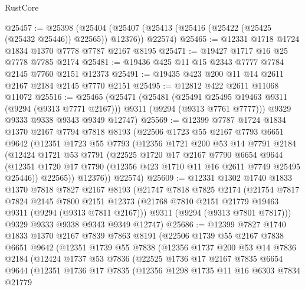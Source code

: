 \begin{lexlean}{RustCore}
\begin{coremodule}
@25457 := @25398
    (@25404 (@25407 (@25413 (@25416 (@25422 (@25425 (@25432 @25446)) @22565)) @12376)) @22574)
@25465 := @12331 @1718 @1724 @1834 @1370 @7778 @7787 @2167 @8195
@25471 := @19427 @1717 @16 @25 @7778 @7785 @2174
@25481 := @19436 @425 @11 @15 @2343 @7777 @7784 @2145 @7760 @2151 @12373
@25491 := @19435 @423 @200 @11 @14 @2611 @2167 @2184 @2145 @7770 @2151
@25495 := @12812 @422 @2611 @11068 @11072
@25516 := @25465
    (@25471
      (@25481
        (@25491 @25495 @19463 @9311 (@9294 (@9313 @7771 @2167)))
        @9311
        (@9294 (@9313 @7761 @7777)))
      @9329
      @9333
      @9338
      @9343
      @9349
      @12747)
@25569 := @12399
    @7787
    @1724
    @1834
    @1370
    @2167
    @7794
    @7818
    @8193
    (@22506
      @1723
      @55
      @2167
      @7793
      @6651
      @9642
      (@12351
        @1723
        @55
        @7793
        (@12356
          @1721
          @200
          @53
          @14
          @7791
          @2184
          (@12424
            @1721
            @53
            @7791
            (@22525
              @1720
              @17
              @2167
              @7790
              @6654
              @9644
              (@12351 @1720 @17 @7790 (@12356 @423 @1710 @11 @16 @2611 @7749 @25495 @25446))
              @22565))
          @12376))
      @22574)
@25609 := @12331
    @1302
    @1740
    @1833
    @1370
    @7818
    @7827
    @2167
    @8193
    (@21747
      @7818
      @7825
      @2174
      (@21754
        @7817
        @7824
        @2145
        @7800
        @2151
        @12373
        (@21768 @7810 @2151 @21779 @19463 @9311 (@9294 (@9313 @7811 @2167)))
        @9311
        (@9294 (@9313 @7801 @7817)))
      @9329
      @9333
      @9338
      @9343
      @9349
      @12747)
@25686 := @12399
    @7827
    @1740
    @1833
    @1370
    @2167
    @7839
    @7863
    @8191
    (@22506
      @1739
      @55
      @2167
      @7838
      @6651
      @9642
      (@12351
        @1739
        @55
        @7838
        (@12356
          @1737
          @200
          @53
          @14
          @7836
          @2184
          (@12424
            @1737
            @53
            @7836
            (@22525
              @1736
              @17
              @2167
              @7835
              @6654
              @9644
              (@12351
                @1736
                @17
                @7835
                (@12356
                  @1298
                  @1735
                  @11
                  @16
                  @6303
                  @7834
                  @21779

\end{coremodule}
\end{lexlean}
